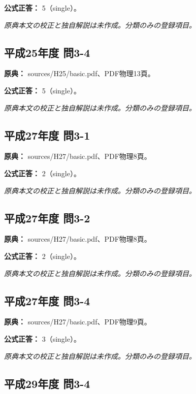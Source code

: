 \textbf{公式正答：} 5（single）。

\par\textit{原典本文の校正と独自解説は未作成。分類のみの登録項目。}

\subsection{平成25年度 問3-4}
\label{q:h25-reg-basic-3-4}

\noindent\textbf{原典：} sources/H25/basic.pdf、PDF物理13頁。

\textbf{公式正答：} 5（single）。

\par\textit{原典本文の校正と独自解説は未作成。分類のみの登録項目。}

\subsection{平成27年度 問3-1}
\label{q:h27-reg-basic-3-1}

\noindent\textbf{原典：} sources/H27/basic.pdf、PDF物理8頁。

\textbf{公式正答：} 2（single）。

\par\textit{原典本文の校正と独自解説は未作成。分類のみの登録項目。}

\subsection{平成27年度 問3-2}
\label{q:h27-reg-basic-3-2}

\noindent\textbf{原典：} sources/H27/basic.pdf、PDF物理8頁。

\textbf{公式正答：} 2（single）。

\par\textit{原典本文の校正と独自解説は未作成。分類のみの登録項目。}

\subsection{平成27年度 問3-4}
\label{q:h27-reg-basic-3-4}

\noindent\textbf{原典：} sources/H27/basic.pdf、PDF物理9頁。

\textbf{公式正答：} 3（single）。

\par\textit{原典本文の校正と独自解説は未作成。分類のみの登録項目。}

\subsection{平成29年度 問3-4}
\label{q:h29-reg-basic-3-4}

